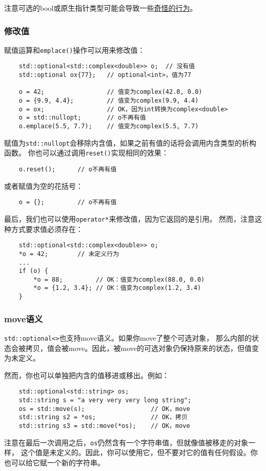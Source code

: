 注意可选的bool或原生指针类型可能会导致一些\hyperref[ch15.3.1]{奇怪的行为}。

\subsubsection*{修改值}
赋值运算和\texttt{emplace()}操作可以用来修改值：
\begin{lstlisting}
    std::optional<std::complex<double>> o;  // 没有值
    std::optional ox{77};   // optional<int>，值为77

    o = 42;                 // 值变为complex(42.0, 0.0)
    o = {9.9, 4.4};         // 值变为complex(9.9, 4.4)
    o = ox;                 // OK，因为int转换为complex<double>
    o = std::nullopt;       // o不再有值
    o.emplace(5.5, 7.7);    // 值变为complex(5.5, 7.7)
\end{lstlisting}
赋值为\texttt{std::nullopt}会移除内含值，如果之前有值的话将会调用内含类型的析构函数。
你也可以通过调用\texttt{reset()}实现相同的效果：
\begin{lstlisting}
    o.reset();      // o不再有值
\end{lstlisting}
或者赋值为空的花括号：
\begin{lstlisting}
    o = {};         // o不再有值
\end{lstlisting}
最后，我们也可以使用\texttt{operator*}来修改值，因为它返回的是引用。
然而，注意这种方式要求值必须存在：
\begin{lstlisting}
    std::optional<std::complex<double>> o;
    *o = 42;        // 未定义行为
    ...
    if (o) {
        *o = 88;         // OK：值变为complex(88.0, 0.0)
        *o = {1.2, 3.4}; // OK：值变为complex(1.2, 3.4)
    }
\end{lstlisting}

\subsubsection*{move语义}
\texttt{std::optional<>}也支持move语义。如果你move了整个可选对象，
那么内部的状态会被拷贝，值会被move。因此，被move的可选对象仍保持原来的状态，但值变为未定义。

然而，你也可以单独把内含的值移进或移出。例如：
\begin{lstlisting}
    std::optional<std::string> os;
    std::string s = "a very very very long string";
    os = std::move(s);                  // OK，move
    std::string s2 = *os;               // OK，拷贝
    std::string s3 = std::move(*os);    // OK，move
\end{lstlisting}
注意在最后一次调用之后，\texttt{os}仍然含有一个字符串值，但就像值被移走的对象一样，
这个值是未定义的。因此，你可以使用它，但不要对它的值有任何假设。你也可以给它赋一个新的字符串。


